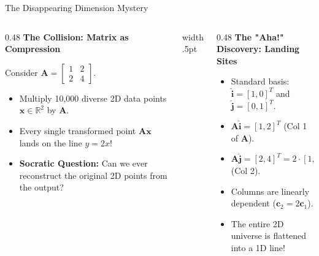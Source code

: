 \documentclass[../m00-session-02.tex]{subfiles}
\begin{document}
\begin{frame}[fragile]{The Disappearing Dimension Mystery}
  \begin{columns}[T,onlytextwidth]
    \begin{column}{0.48\textwidth}
      {\small\bfseries\color{UpGradRed}The Collision: Matrix as Compression}\par\vspace{0.06cm}
      Consider $\mathbf{A} = \begin{bmatrix} 1 & 2 \\ 2 & 4 \end{bmatrix}$.
      \par\vspace{0.04cm}
      \begin{itemize}\setlength{\itemsep}{0.18em}\small
        \item Multiply 10,000 diverse 2D data points $\mathbf{x} \in \mathbb{R}^2$ by $\mathbf{A}$.
        \item Every single transformed point $\mathbf{A}\mathbf{x}$ lands on the line $y = 2x$!
        \item \textcolor{UpGradRed}{\textbf{Socratic Question:}} Can we ever reconstruct the original 2D points from the output?
      \end{itemize}
    \end{column}
    \hfill{\color{UpGradRule}\vrule width .5pt}\hfill
    \begin{column}{0.48\textwidth}
      {\small\bfseries\color{AWSEmerald}The "Aha!" Discovery: Landing Sites}\par\vspace{0.06cm}
      \begin{itemize}\setlength{\itemsep}{0.18em}\small
        \item Standard basis: $\hat{\mathbf{i}} = [1, 0]^T$ and $\hat{\mathbf{j}} = [0, 1]^T$.
        \item $\mathbf{A}\hat{\mathbf{i}} = [1, 2]^T$ (Col 1 of $\mathbf{A}$).
        \item $\mathbf{A}\hat{\mathbf{j}} = [2, 4]^T = 2 \cdot [1, 2]^T$ (Col 2).
        \item Columns are linearly dependent ($\mathbf{c}_2 = 2\mathbf{c}_1$).
        \item The entire 2D universe is flattened into a 1D line!
      \end{itemize}
      \vspace{0.04cm}
    \end{column}
  \end{columns}
\end{frame}
\end{document}
